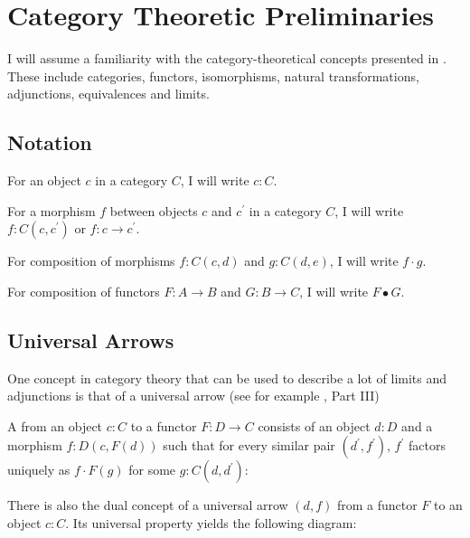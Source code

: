 \chapter{Category Theoretic Preliminaries}

I will assume a familiarity with the category-theoretical concepts presented in \cite{CT4P}. These include categories, functors, isomorphisms, natural transformations, adjunctions, equivalences and limits.

\section{Notation}
For an object $ c $ in a category $ C $, I will write $ c: C $.

For a morphism $ f $ between objects $ c $ and $ c^\prime $ in a category $ C $, I will write $ f: C(c, c^\prime) $ or $ f: c \to c^\prime $.

For composition of morphisms $ f: C(c, d) $ and $ g: C(d, e) $, I will write $ f \cdot g $.

For composition of functors $ F: A \to B $ and $ G: B \to C $, I will write $ F \bullet G $.

\section{Universal Arrows}

One concept in category theory that can be used to describe a lot of limits and adjunctions is that of a universal arrow (see for example \cite{MacLane}, Part III)
\begin{definition}
  A  from an object $ c: C $ to a functor $ F: D \to C $ consists of an object $ d: D $ and a morphism $ f: D(c, F(d)) $ such that for every similar pair $ (d^\prime, f^\prime) $, $ f^\prime $ factors uniquely as $ f \cdot F(g) $ for some $ g: C(d, d^\prime) $:
  \begin{center}
  \end{center}
\end{definition}

There is also the dual concept of a universal arrow $ (d, f) $ from a functor $ F $ to an object $ c: C $. Its universal property yields the following diagram:
\begin{center}
\end{center}

